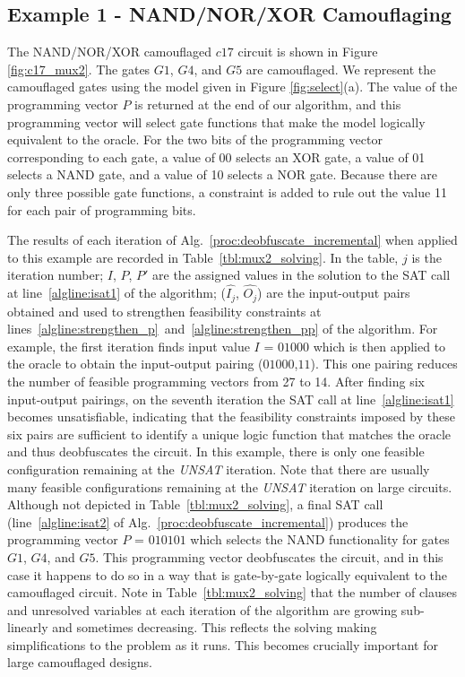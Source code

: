\documentclass[proposal]{umassthesis}  %
\begin{document}
\subsection{Example 1 - NAND/NOR/XOR Camouflaging}

The NAND/NOR/XOR camouflaged $c17$ circuit is shown in Figure \ref{fig:c17_mux2}. The gates $G{1}$, $G{4}$, and $G{5}$ are camouflaged. We represent the camouflaged gates using the model given in Figure \ref{fig:select}(a). The value of the programming vector $P$ is returned at the end of our algorithm, and this programming vector will select gate functions that make the model logically equivalent to the oracle. For the two bits of the programming vector corresponding to each gate, a value of 00 selects an XOR gate, a value of 01 selects a NAND gate, and a value of 10 selects a NOR gate. Because there are only three possible gate functions, a constraint is added to rule out the value 11 for each pair of programming bits.

The results of each iteration of Alg.~\ref{proc:deobfuscate_incremental} when applied to this example are recorded in Table~\ref{tbl:mux2_solving}. In the table, $j$ is the iteration number; $I$, $P$, $P'$ are the assigned values in the solution to the SAT call at line~\ref{algline:isat1} of the algorithm; ($\hat{I_{j}}$, $\hat{O_{j}}$) are the input-output pairs obtained and used to strengthen feasibility constraints at lines~\ref{algline:strengthen_p}~and~\ref{algline:strengthen_pp} of the algorithm. For example, the first iteration finds input value $I$ = $01000$ which is then applied to the oracle to obtain the input-output pairing ($01000$,$11$). This one pairing reduces the number of feasible programming vectors from 27 to 14. After finding six input-output pairings, on the seventh iteration the SAT call at line~\ref{algline:isat1} becomes unsatisfiable, indicating that the feasibility constraints imposed by these six pairs are sufficient to identify a unique logic function that matches the oracle and thus deobfuscates the circuit. In this example, there is only one feasible configuration remaining at the \textit{UNSAT} iteration. Note that there are usually many feasible configurations remaining at the \textit{UNSAT} iteration on large circuits. Although not depicted in Table~\ref{tbl:mux2_solving}, a final SAT call (line~\ref{algline:isat2} of Alg.~\ref{proc:deobfuscate_incremental}) produces the programming vector $P$ = $010101$ which selects the NAND functionality for gates $G1$, $G4$, and $G5$. This programming vector deobfuscates the circuit, and in this case it happens to do so in a way that is gate-by-gate logically equivalent to the camouflaged circuit. Note in Table~\ref{tbl:mux2_solving} that the number of clauses and unresolved variables at each iteration of the algorithm are growing sub-linearly and sometimes decreasing. This reflects the solving making simplifications to the problem as it runs. This becomes crucially important for large camouflaged designs.
\end{document}
